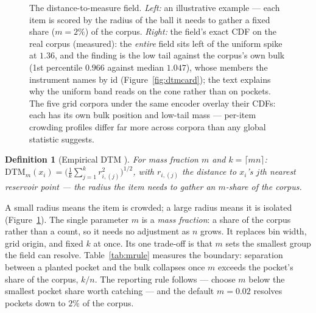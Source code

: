 \documentclass[11pt,letterpaper]{article}
\newtheorem{definition}{Definition}
\newcommand{\dtm}{\mathrm{DTM}}
\begin{document}
\begin{figure}[t]
\begin{minipage}[t]{0.53\textwidth}
\end{minipage}
\caption{The distance-to-measure field. \emph{Left:} an illustrative
example
--- each item is scored by the radius of the ball it needs to gather a fixed
share ($m = 2\%$) of the corpus. \emph{Right:} the field's exact CDF on the
real corpus (measured): the \emph{entire} field sits left of the uniform
spike at $1.36$, and the finding is the low tail against the corpus's own
bulk (1st percentile $0.966$ against median $1.047$), whose members the
instrument names by id (Figure~\ref{fig:dtmcard}); the text explains why
the uniform band reads on the cone rather than on pockets. The five grid
corpora under the same encoder overlay their CDFs: each has its own bulk
position and low-tail mass --- per-item crowding profiles differ far more
across corpora than any global statistic suggests.}
\label{fig:dtm}
\end{figure}

\begin{definition}[Empirical DTM \cite{chazal2011,chazalmichel2021}]
For mass fraction $m$ and $k = \lceil m n\rceil$: $\dtm_m(x_i) =
\big(\tfrac1k \sum_{j=1}^{k} r_{i,(j)}^2\big)^{1/2}$, with $r_{i,(j)}$ the
distance to $x_i$'s $j$th nearest reservoir point --- the radius the item
needs to gather an $m$-share of the corpus.
\end{definition}

A small radius means the item is crowded; a large radius means it is
isolated (Figure~\ref{fig:dtm}). The single parameter $m$ is a \emph{mass
fraction}: a share of the corpus rather than a count, so it needs no
adjustment as $n$ grows. It replaces bin width, grid origin, and fixed $k$
at once. Its one trade-off is that $m$ sets the smallest group the field
can resolve. Table~\ref{tab:mrule} measures the boundary: separation
between a planted pocket and the bulk collapses once $m$ exceeds the
pocket's share of the corpus, $k/n$. The reporting rule follows --- choose
$m$ below the smallest pocket share worth catching --- and the default $m
= 0.02$ resolves pockets down to $2\%$ of the corpus.
\end{document}
